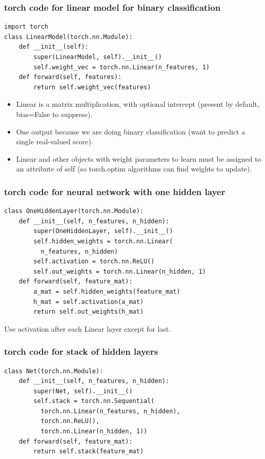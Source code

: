\documentclass{beamer}
\begin{document}
\begin{frame}[fragile]
  \frametitle{torch code for linear model for binary classification}
\begin{verbatim}
import torch
class LinearModel(torch.nn.Module):
    def __init__(self):
        super(LinearModel, self).__init__()
        self.weight_vec = torch.nn.Linear(n_features, 1)
    def forward(self, features):
        return self.weight_vec(features)
\end{verbatim}

  \begin{itemize}
  \item Linear is a matrix multiplication, with optional intercept
    (present by default, bias=False to suppress).
  \item One output because we are doing binary classification (want to
    predict a single real-valued score).
  \item Linear and other objects with weight parameters to learn must
    be assigned to an attribute of self (so torch.optim algorithms can
    find weights to update).
  \end{itemize}
\end{frame}

\begin{frame}[fragile]
  \frametitle{torch code for neural network with one hidden layer}
\begin{verbatim}
class OneHiddenLayer(torch.nn.Module):
    def __init__(self, n_features, n_hidden):
        super(OneHiddenLayer, self).__init__()
        self.hidden_weights = torch.nn.Linear(
          n_features, n_hidden)
        self.activation = torch.nn.ReLU()
        self.out_weights = torch.nn.Linear(n_hidden, 1)
    def forward(self, feature_mat):
        a_mat = self.hidden_weights(feature_mat)
        h_mat = self.activation(a_mat)
        return self.out_weights(h_mat)
\end{verbatim}

Use activation after each Linear layer except for last.
\end{frame}

\begin{frame}[fragile]
  \frametitle{torch code for stack of hidden layers}
\begin{verbatim}
class Net(torch.nn.Module):
    def __init__(self, n_features, n_hidden):
        super(Net, self).__init__()
        self.stack = torch.nn.Sequential(
          torch.nn.Linear(n_features, n_hidden),
          torch.nn.ReLU(),
          torch.nn.Linear(n_hidden, 1))
    def forward(self, feature_mat):
        return self.stack(feature_mat)
\end{verbatim}
\end{frame}
\end{document}
